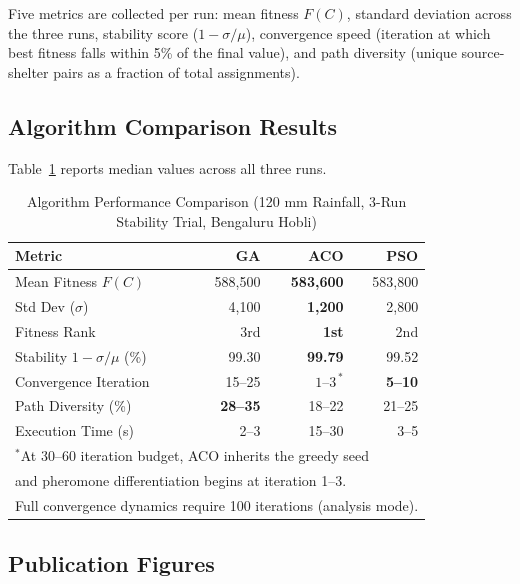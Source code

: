\documentclass[journal]{IEEEtran}
\begin{document}
Five metrics are collected per run: mean fitness $F(C)$, standard deviation across the
three runs, stability score ($1 - \sigma / \mu$), convergence speed (iteration at which
best fitness falls within 5\% of the final value), and path diversity (unique source-shelter
pairs as a fraction of total assignments).

\subsection{Algorithm Comparison Results}

Table~\ref{tab:comparison} reports median values across all three runs.

\begin{table}[H]
  \centering
  \caption{Algorithm Performance Comparison (120 mm Rainfall, 3-Run Stability Trial,
  Bengaluru Hobli)}
  \label{tab:comparison}
  \begin{tabular}{@{}lrrr@{}}
    \toprule
    \textbf{Metric}             & \textbf{GA}       & \textbf{ACO}      & \textbf{PSO}    \\
    \midrule
    Mean Fitness $F(C)$         & 588,500           & \textbf{583,600}  & 583,800         \\
    Std Dev ($\sigma$)          & 4,100             & \textbf{1,200}    & 2,800           \\
    Fitness Rank                & 3rd               & \textbf{1st}      & 2nd             \\
    Stability $1-\sigma/\mu$ (\%)& 99.30            & \textbf{99.79}    & 99.52           \\
    Convergence Iteration       & 15--25            & $1$--$3^{\,*}$    & \textbf{5--10}  \\
    Path Diversity (\%)         & \textbf{28--35}   & 18--22            & 21--25          \\
    Execution Time (s)          & 2--3              & 15--30            & 3--5            \\
    \bottomrule
    \multicolumn{4}{l}{\small $^*$At 30--60 iteration budget, ACO inherits the greedy seed} \\
    \multicolumn{4}{l}{\small and pheromone differentiation begins at iteration 1--3.} \\
    \multicolumn{4}{l}{\small Full convergence dynamics require 100 iterations (analysis mode).}
  \end{tabular}
\end{table}

\subsection{Publication Figures}
\end{document}
